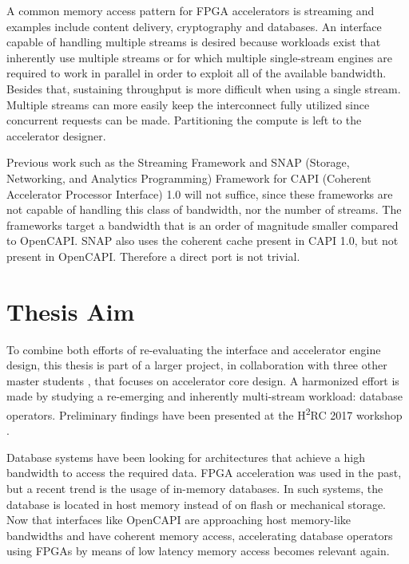 A common memory access pattern for FPGA accelerators is streaming and examples include content delivery, cryptography and databases. An interface capable of handling multiple streams is desired because workloads exist that inherently use multiple streams or for which multiple single-stream engines are required to work in parallel in order to exploit all of the available bandwidth. Besides that, sustaining throughput is more difficult when using a single stream. Multiple streams can more easily keep the interconnect fully utilized since concurrent requests can be made. Partitioning the compute is left to the accelerator designer.

Previous work such as the Streaming Framework \cite{brobbel-github, brobbel-slides} and SNAP (Storage, Networking, and Analytics Programming) Framework \cite{snap-github, snap-slides} for CAPI (Coherent Accelerator Processor Interface) 1.0 will not suffice, since these frameworks are not capable of handling this class of bandwidth, nor the number of streams. The frameworks target a bandwidth that is an order of magnitude smaller compared to OpenCAPI. SNAP also uses the coherent cache present in CAPI 1.0, but not present in OpenCAPI. Therefore a direct port is not trivial.





\newpage
\section{Thesis Aim}
\label{sec:aim}
To combine both efforts of re-evaluating the interface and accelerator engine design, this thesis is part of a larger project, in collaboration with three other master students \cite{huang-msc-thesis, yang-msc-thesis, zeng-msc-thesis}, that focuses on accelerator core design. A harmonized effort is made by studying a re-emerging and inherently multi-stream workload: database operators. Preliminary findings have been presented at the H\textsuperscript{2}RC 2017 workshop \cite{h2rc}.

Database systems have been looking for architectures that achieve a high bandwidth to access the required data. FPGA acceleration was used in the past, but a recent trend is the usage of in-memory databases. In such systems, the database is located in host memory instead of on flash or mechanical storage. Now that interfaces like OpenCAPI are approaching host memory-like bandwidths and have coherent memory access, accelerating database operators using FPGAs by means of low latency memory access becomes relevant again.

